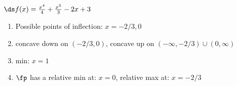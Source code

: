 {$\ds f(x) = \frac{x^4}{4}+\frac{x^3}{3}-2 x+3$
}
{\begin{enumerate}[label=(\alph*)]
\item Possible points of inflection: $x=-2/3,0$
\item concave down on $(-2/3,0)$, concave up on $(-\infty,-2/3)\cup(0,\infty)$
\item min: $x=1$
\item $\fp$ has a relative min at: $x=0$, relative max at: $x=-2/3$
\end{enumerate}}
